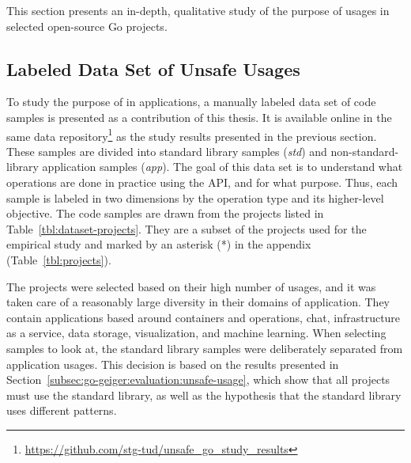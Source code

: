 This section presents an in-depth, qualitative study of the purpose of \unsafe{} usages in
\projsForLabeledCodeSnippets{} selected open-source Go projects.



\subsection{Labeled Data Set of Unsafe Usages}\label{subsec:go-geiger:qualitative-evaluation:labeled-dataset}

To study the purpose of \unsafe{} in applications, a manually labeled data set of \numberLabeledCodeSnippets{} code
samples is presented as a contribution of this thesis.
It is available online in the same data repository\footnote{\url{https://github.com/stg-tud/unsafe_go_study_results}} as
the study results presented in the previous section.
These samples are divided into \numberLabeledCodeSnippetsStd{} standard library samples (\textit{std}) and
\numberLabeledCodeSnippetsApp{} non-standard-library application samples (\textit{app}).
The goal of this data set is to understand what operations are done in practice using the \unsafe{} \acrshort{API},
and for what purpose.
Thus, each sample is labeled in two dimensions by the operation type and its higher-level objective.
The \numberLabeledCodeSnippets{} code samples are drawn from the projects listed in Table~\ref{tbl:dataset-projects}.
They are a subset of the projects used for the empirical study and marked by an asterisk (*) in the appendix
(Table~\ref{tbl:projects}).



The projects were selected based on their high number of \unsafe{} usages, and it was taken care of a reasonably large
diversity in their domains of application.
They contain applications based around containers and operations, chat, infrastructure as a service, data storage,
visualization, and machine learning.
When selecting samples to look at, the standard library samples were deliberately separated from application usages.
This decision is based on the results presented in Section~\ref{subsec:go-geiger:evaluation:unsafe-usage}, which show
that all projects must use the standard library, as well as the hypothesis that the standard library uses different
\unsafe{} patterns.


